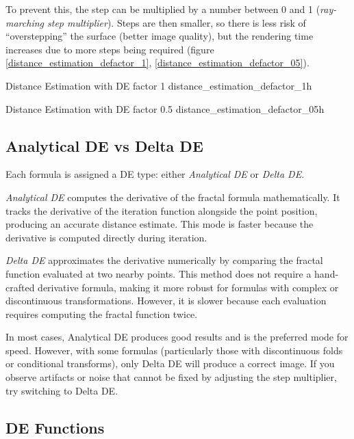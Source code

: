 To prevent this, the step can be multiplied by a number between 0 and 1 (\emph{ray-marching step multiplier}). Steps are then smaller, so there is less risk of ``overstepping'' the surface (better image quality), but the rendering time increases due to more steps being required (figure \ref{distance_estimation_defactor_1}, \ref{distance_estimation_defactor_05}).

{Distance Estimation with DE factor 1}
{distance_estimation_defactor_1}{h}

{Distance Estimation with DE factor 0.5}
{distance_estimation_defactor_05}{h}

\subsection{Analytical DE vs Delta DE}\label{analytical-vs-delta-de}

Each formula is assigned a DE type: either \emph{Analytical DE} or \emph{Delta DE}.

\emph{Analytical DE} computes the derivative of the fractal formula mathematically. It tracks the derivative of the iteration function alongside the point position, producing an accurate distance estimate. This mode is faster because the derivative is computed directly during iteration.

\emph{Delta DE} approximates the derivative numerically by comparing the fractal function evaluated at two nearby points. This method does not require a hand-crafted derivative formula, making it more robust for formulas with complex or discontinuous transformations. However, it is slower because each evaluation requires computing the fractal function twice.

In most cases, Analytical DE produces good results and is the preferred mode for speed. However, with some formulas (particularly those with discontinuous folds or conditional transforms), only Delta DE will produce a correct image. If you observe artifacts or noise that cannot be fixed by adjusting the step multiplier, try switching to Delta DE.

\subsection{DE Functions}\label{de-functions}

